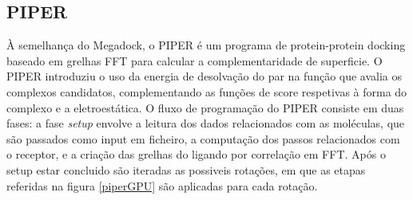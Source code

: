 
%


 \subsection{PIPER}
 À semelhança do Megadock, o PIPER é um programa de protein-protein docking baseado em grelhas FFT para calcular a complementaridade de superficie. O PIPER introduziu o uso da energia de desolvação do par na função que avalia os complexos candidatos, complementando as funções de score respetivas à forma do complexo e a eletroestática. O fluxo de programação do PIPER consiste em duas fases: a fase \textit{setup} envolve a leitura dos dados relacionados com as moléculas, que são passados como input em ficheiro, a computação dos passos relacionados com o receptor, e a criação das grelhas do ligando por correlação em FFT. Após o setup estar concluido são iteradas as possiveis rotações, em que as etapas referidas na figura \ref{piperGPU} são aplicadas para cada rotação. 
 
